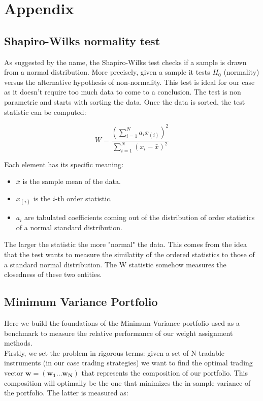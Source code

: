 \documentclass[12pt]{article} %
\numberwithin{equation}{subsection}
\begin{document}
\section*{Appendix}


\subsection*{Shapiro-Wilks normality test}

As suggested by the name, the Shapiro-Wilks test checks if a sample is drawn from a normal distribution. More precisely, given a sample it tests $H_0$ (normality) versus the alternative hypothesis of non-normality. This test is ideal for our case as it doesn't require too much data to come to a conclusion. The test is non parametric and starts with sorting the data. Once the data is sorted, the test statistic can be computed:

$$
\displaystyle W = \frac{\left(\sum\limits_{i=1}^N a_{i}x_{(i)}\right)^2}{\sum\limits_{i=1}^N(x_i-\bar{x})^2}
$$

Each element has its specific meaning:
\begin{itemize}
	\item $\bar{x}$ is the sample mean of the data.
	\item $x_{(i)}$ is the $i$-th order statistic. 
	\item $a_i$ are tabulated coefficients coming out of the distribution of order statistics of a normal standard distribution.
\end{itemize}

The larger the statistic the more "normal" the data. This comes from the idea that the test wants to measure the similatity of the ordered statistics to those of a standard normal distribution. The W statistic somehow measures the closedness of these two entities.

\subsection*{Minimum Variance Portfolio}

Here we build the foundations of the Minimum Variance portfolio used as a benchmark to measure the relative performance of our weight assignment methods.\\
Firstly, we set the problem in rigorous terms: given a set of N tradable instruments (in our case trading strategies) we want to find the optimal trading vector $\mathbf{w} = (\mathbf{w_1} \dots \mathbf{w_N})$ that represents the composition of our portfolio. This composition will optimally be the one that minimizes the in-sample variance of the portfolio. The latter is measured as:
\end{document}
